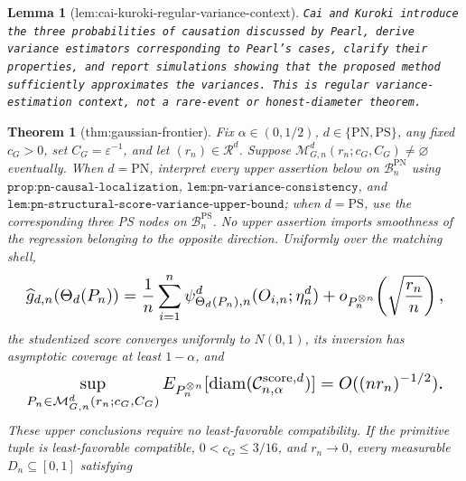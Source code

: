 \documentclass{article}
\newtheorem{theorem}{Theorem}
\newtheorem{lemma}{Lemma}
\begin{document}
\begin{lemma}[lem:cai-kuroki-regular-variance-context]\label{lem:cai-kuroki-regular-variance-context}
\texttt{Cai and Kuroki introduce the three probabilities of causation discussed by Pearl,\allowbreak{} derive variance estimators corresponding to Pearl's cases,\allowbreak{} clarify their properties,\allowbreak{} and report simulations showing that the proposed method sufficiently approximates the variances. This is regular variance-\allowbreak{}estimation context,\allowbreak{} not a rare-\allowbreak{}event or honest-\allowbreak{}diameter theorem.}
\end{lemma}

\begin{theorem}[thm:gaussian-frontier]\label{thm:gaussian-frontier}
Fix \(\alpha\in(0,1/2)\), \(d\in\{\mathrm{PN},\mathrm{PS}\}\), any fixed \(c_G>0\), set \(C_G=\varepsilon^{-1}\), and let \((r_n)\in\mathcal R^d\). Suppose \(\mathcal M_{G,n}^d(r_n;c_G,C_G)\ne\varnothing\) eventually. When \(d=\mathrm{PN}\), interpret every upper assertion below on \(\mathcal B_n^{\mathrm{PN}}\) using \(\texttt{prop:pn-causal-localization}\), \(\texttt{lem:pn-variance-consistency}\), and \(\texttt{lem:pn-structural-score-variance-upper-bound}\); when \(d=\mathrm{PS}\), use the corresponding three PS nodes on \(\mathcal B_n^{\mathrm{PS}}\). No upper assertion imports smoothness of the regression belonging to the opposite direction. Uniformly over the matching shell,
\[
\makebox[\linewidth][c]{\resizebox{0.98\linewidth}{!}{\par\noindent \makebox[\linewidth][c]{\resizebox{0.98\linewidth}{!}{\(\displaystyle \displaystyle \widehat g_{d,n}(\Theta_d(P_n))=\frac1n\sum_{i=1}^n\psi^d_{\Theta_d(P_n),n}(O_{i,n};\eta_n^d)+o_{P_n^{\otimes n}}\!\left(\sqrt{\frac{r_n}{n}}\right),\)}}\par\noindent}}
\]
the studentized score converges uniformly to \(N(0,1)\), its inversion has asymptotic coverage at least \(1-\alpha\), and
\[
\makebox[\linewidth][c]{\resizebox{0.98\linewidth}{!}{\par\noindent \makebox[\linewidth][c]{\resizebox{0.98\linewidth}{!}{\(\displaystyle \displaystyle \sup_{P_n\in\mathcal M_{G,n}^d(r_n;c_G,C_G)}E_{P_n^{\otimes n}}[\operatorname{diam}(\mathcal C_{n,\alpha}^{\mathrm{score},d})]=O((nr_n)^{-1/2}).\)}}\par\noindent}}
\]
These upper conclusions require no least-favorable compatibility. If the primitive tuple is least-favorable compatible, \(0<c_G\le3/16\), and \(r_n\to0\), every measurable \(D_n\subseteq[0,1]\) satisfying

\end{theorem}
\end{document}
